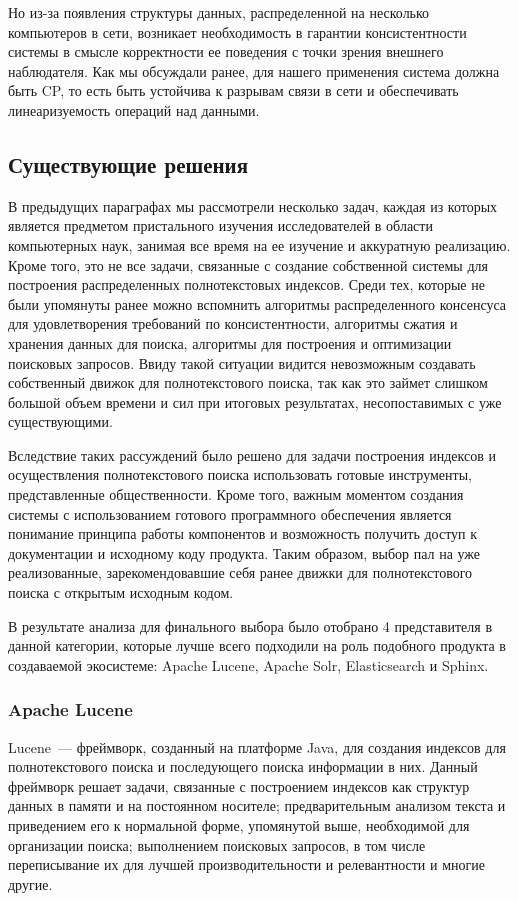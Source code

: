Но из-за появления структуры данных, распределенной на несколько компьютеров в сети, возникает необходимость в гарантии консистентности системы в смысле корректности ее поведения с точки зрения внешнего наблюдателя. Как мы обсуждали ранее, для нашего применения система должна быть CP, то есть быть устойчива к разрывам связи в сети и обеспечивать линеаризуемость операций над данными.

\subsection{Существующие решения}

В предыдущих параграфах мы рассмотрели несколько задач, каждая из которых является предметом пристального изучения исследователей в области компьютерных наук, занимая все время на ее изучение и аккуратную реализацию. Кроме того, это не все задачи, связанные с создание собственной системы для построения распределенных полнотекстовых индексов. Среди тех, которые не были упомянуты ранее можно вспомнить алгоритмы распределенного консенсуса для удовлетворения требований по консистентности, алгоритмы сжатия и хранения данных для поиска, алгоритмы для построения и оптимизации поисковых запросов. Ввиду такой ситуации видится невозможным создавать собственный движок для полнотекстового поиска, так как это займет слишком большой объем времени и сил при итоговых результатах, несопоставимых с уже существующими.

Вследствие таких рассуждений было решено для задачи построения индексов и осуществления полнотекстового поиска использовать готовые инструменты, представленные общественности. Кроме того, важным моментом создания системы с использованием готового программного обеспечения является понимание принципа работы компонентов и возможность получить доступ к документации и исходному коду продукта. Таким образом, выбор пал на уже реализованные, зарекомендовавшие себя ранее движки для полнотекстового поиска с открытым исходным кодом.

В результате анализа для финального выбора было отобрано 4 представителя в данной категории, которые лучше всего подходили на роль подобного продукта в создаваемой экосистеме: Apache Lucene\cite{lucene}, Apache Solr, Elasticsearch и Sphinx.

\subsubsection{Apache Lucene}

Lucene~--- фреймворк, созданный на платформе Java, для создания индексов для полнотекстового поиска и последующего поиска информации в них. Данный фреймворк решает задачи, связанные с построением индексов как структур данных в памяти и на постоянном носителе; предварительным анализом текста и приведением его к нормальной форме, упомянутой выше, необходимой для организации поиска; выполнением поисковых запросов, в том числе переписывание их для лучшей производительности и релевантности и многие другие.

